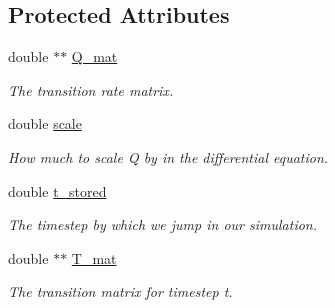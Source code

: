 \subsection*{Protected Attributes}
\begin{DoxyCompactItemize}
\item 
\mbox{\label{classrcombinator_1_1PointMutationModel_a5affb482b1e4434bd1b2c6fc1c579934}} 
double $\ast$$\ast$ \mbox{\hyperlink{classrcombinator_1_1PointMutationModel_a5affb482b1e4434bd1b2c6fc1c579934}{Q\+\_\+mat}}
\begin{DoxyCompactList}\small\item\em The transition rate matrix. \end{DoxyCompactList}\item 
\mbox{\label{classrcombinator_1_1PointMutationModel_a328a30a438bb1b6a625faa3f714a85c8}} 
double \mbox{\hyperlink{classrcombinator_1_1PointMutationModel_a328a30a438bb1b6a625faa3f714a85c8}{scale}}
\begin{DoxyCompactList}\small\item\em How much to scale Q by in the differential equation. \end{DoxyCompactList}\item 
\mbox{\label{classrcombinator_1_1PointMutationModel_a8ae23bc482a483e139cdb94bdc332a72}} 
double \mbox{\hyperlink{classrcombinator_1_1PointMutationModel_a8ae23bc482a483e139cdb94bdc332a72}{t\+\_\+stored}}
\begin{DoxyCompactList}\small\item\em The timestep by which we jump in our simulation. \end{DoxyCompactList}\item 
\mbox{\label{classrcombinator_1_1PointMutationModel_ac8ec41d0bffdc2221ad4b1cfb06424e8}} 
double $\ast$$\ast$ \mbox{\hyperlink{classrcombinator_1_1PointMutationModel_ac8ec41d0bffdc2221ad4b1cfb06424e8}{T\+\_\+mat}}
\begin{DoxyCompactList}\small\item\em The transition matrix for timestep {\itshape t}. \end{DoxyCompactList}\end{DoxyCompactItemize}


